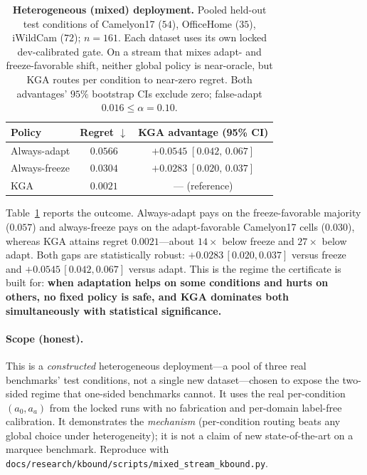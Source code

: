 \documentclass[conference]{IEEEtran}
\theoremstyle{plain}
\theoremstyle{definition}
\begin{document}
\begin{table}[t]
\centering
\caption{\textbf{Heterogeneous (mixed) deployment.} Pooled held-out test
conditions of Camelyon17 ($54$), OfficeHome ($35$), iWildCam ($72$); $n{=}161$.
Each dataset uses its own locked dev-calibrated gate. On a stream that mixes
adapt- and freeze-favorable shift, neither global policy is near-oracle, but
\textsc{KGA} routes per condition to near-zero regret. Both advantages' $95\%$
bootstrap CIs exclude zero; false-adapt $0.016\le\alpha{=}0.10$.}
\label{tab:mixedstream}
\small
\begin{tabular}{lcc}
\toprule
Policy & Regret $\downarrow$ & \textsc{KGA} advantage (95\% CI) \\
\midrule
Always-adapt  & $0.0566$ & $+0.0545\;[0.042,\,0.067]$ \\
Always-freeze & $0.0304$ & $+0.0283\;[0.020,\,0.037]$ \\
\textsc{KGA}  & $\mathbf{0.0021}$ & --- (reference) \\
\bottomrule
\end{tabular}
\end{table}

Table~\ref{tab:mixedstream} reports the outcome. Always-adapt pays on the
freeze-favorable majority ($0.057$) and always-freeze pays on the adapt-favorable
Camelyon17 cells ($0.030$), whereas \textsc{KGA} attains regret $0.0021$---about
$14\times$ below freeze and $27\times$ below adapt. Both gaps are statistically
robust: $+0.0283\,[0.020,0.037]$ versus freeze and $+0.0545\,[0.042,0.067]$
versus adapt. This is the regime the certificate is built for: \textbf{when
adaptation helps on some conditions and hurts on others, no fixed policy is safe,
and \textsc{KGA} dominates both simultaneously with statistical significance.}

\paragraph{Scope (honest).} This is a \emph{constructed} heterogeneous
deployment---a pool of three real benchmarks' test conditions, not a single new
dataset---chosen to expose the two-sided regime that one-sided benchmarks cannot.
It uses the real per-condition $(a_0,a_a)$ from the locked runs with no
fabrication and per-domain label-free calibration. It demonstrates the
\emph{mechanism} (per-condition routing beats any global choice under
heterogeneity); it is not a claim of new state-of-the-art on a marquee benchmark.
Reproduce with \texttt{docs/research/kbound/scripts/mixed\_stream\_kbound.py}.
\clearpage
\end{document}
